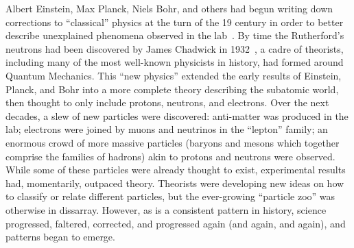 \begin{dissertationintroduction}
Albert Einstein, Max Planck, Niels Bohr, and others had begun writing down corrections to ``classical'' physics at the turn of the 19 century in order to better describe unexplained phenomena observed in the lab~\cite{EinsteinPhotoelectric, Planck, Bohr}. 
By time the Rutherford's neutrons had been discovered by James Chadwick in 1932~\cite{Chadwick1932}, a cadre of theorists, including many of the most well-known physicists in history\footnotemark{}, had formed around Quantum Mechanics.
This ``new physics'' extended the early results of Einstein, Planck, and Bohr into a more complete theory describing the subatomic world, then thought to only include protons, neutrons, and electrons. 
Over the next decades, a slew of new particles were discovered: 
anti-matter was produced in the lab; %
electrons were joined by muons and neutrinos in the ``lepton'' family; %
an enormous crowd of more massive particles (baryons and mesons which together comprise the families of hadrons) akin to protons and neutrons were observed. %
While some of these particles were already thought to exist, experimental results had, momentarily, outpaced theory. 
Theorists were developing new ideas on how to classify or relate different particles, but the ever-growing ``particle zoo'' was otherwise in dissarray. 
However, as is a consistent pattern in history, science progressed, faltered, corrected, and progressed again (and again, and again), and patterns began to emerge. 


\end{dissertationintroduction}
